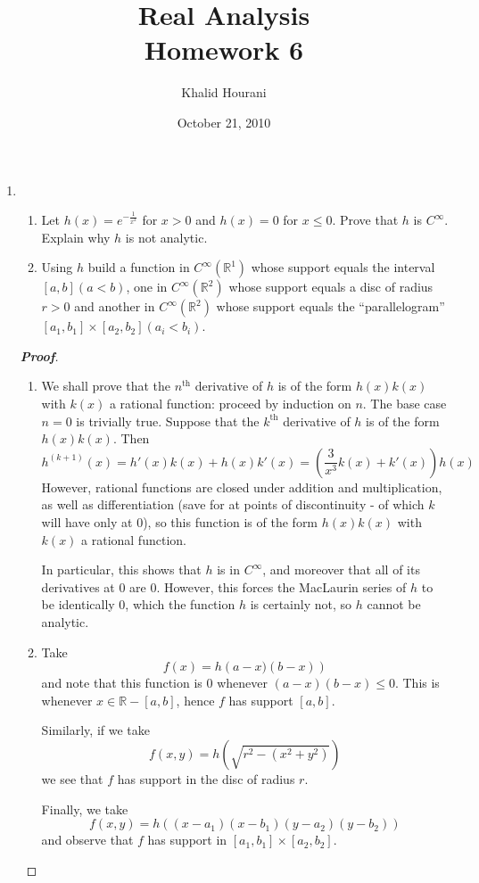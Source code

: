 \documentclass[12pt,leqno]{book}
\title{Real Analysis\\\large Homework 6}
\date{October 21, 2010}
\author{Khalid Hourani}
\theoremstyle{definition}
\newcommand{\R}{\mathbb{R}}
\newenvironment{Proof}{\begin{proof}[\textnormal{\textbf{Proof}}]}{\end{proof}}
\begin{document}
\begin{titlepage}
 \maketitle 
\end{titlepage}

\begin{enumerate}
 \item \begin{enumerate}
        \item Let $h(x)=e^{-\frac{1}{x^2}}$ for $x>0$ and $h(x)=0$ for $x\leq0$. Prove that $h$ is $C^{\infty}$. Explain why $h$ is not analytic.
	\item Using $h$ build a function in $C^{\infty}(\R^1)$ whose support equals the interval $[a,b](a<b)$, one in $C^{\infty}(\R^2)$ whose support equals a disc of radius $r>0$ and another in $C^{\infty}(\R^2)$ whose support equals the ``parallelogram'' $[a_1,b_1]\times[a_2,b_2](a_i<b_i)$.
       \end{enumerate}

\begin{Proof}\indent
 \begin{enumerate}
  \item We shall prove that the $n^{\text{th}}$ derivative of $h$ is of the form $h(x)k(x)$ with $k(x)$ a rational function: proceed by induction on $n$. The base case $n=0$ is trivially true. Suppose that the $k^{\text{th}}$ derivative of $h$ is of the form $h(x)k(x)$. Then \[h^{(k+1)}(x)=h'(x)k(x)+h(x)k'(x)=\left(\frac{3}{x^3}k(x)+k'(x)\right)h(x)\] However, rational functions are closed under addition and multiplication, as well as differentiation (save for at points of discontinuity - of which $k$ will have only at 0), so this function is of the form $h(x)k(x)$ with $k(x)$ a rational function.

In particular, this shows that $h$ is in $C^{\infty}$, and moreover that all of its derivatives at 0 are 0. However, this forces the MacLaurin series of $h$ to be identically 0, which the function $h$ is certainly not, so $h$ cannot be analytic. 
  \item Take \[f(x)=h\left(a-x)(b-x)\right)\] and note that this function is 0 whenever $(a-x)(b-x)\leq0$. This is whenever $x\in\R-[a,b]$, hence $f$ has support $[a,b]$. 

Similarly, if we take \[f(x,y)=h\left(\sqrt{r^2-(x^2+y^2)}\right)\] we see that $f$ has support in the disc of radius $r$.

Finally, we take \[f(x,y)=h\left((x-a_1)(x-b_1)(y-a_2)(y-b_2)\right)\] and observe that $f$ has support in $[a_1,b_1]\times[a_2,b_2]$.
 \end{enumerate}


\end{Proof}
\end{enumerate}
\end{document}
